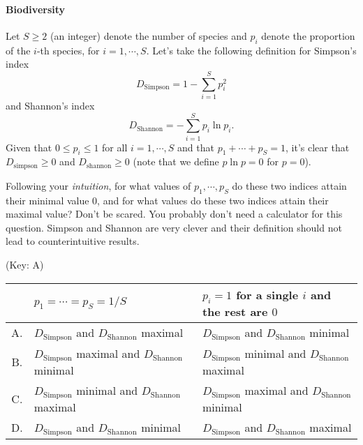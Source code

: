 \documentclass{article}
\begin{document}
\paragraph*{Biodiversity}
Let $S\ge 2$ (an integer) denote the number of species and $p_i$ denote the proportion of the $i$-th species, for $i=1,\cdots,S$.
Let's take the following definition for Simpson's index
\[ D_{\text{Simpson}} = 1 - \sum_{i=1}^S p_i^2 \]
and Shannon's index
\[ D_{\text{Shannon}} = -\sum_{i=1}^S p_i \ln p_i. \]
Given that $0\le p_i \le 1$ for all $i=1,\cdots,S$ and that $p_1+\cdots+p_S = 1$, it's clear that $D_{\text{simpson}} \ge 0$ and $D_{\text{shannon}} \ge 0$ (note that we define $p\ln p = 0$ for $p=0$).
\par
Following your \textit{intuition}, for what values of $p_1,\cdots,p_S$ do these two indices attain their minimal value $0$, and for what values do these two indices attain their maximal value?
Don't be scared.
You probably don't need a calculator for this question.
Simpson and Shannon are very clever and their definition should not lead to counterintuitive results.
\par
(Key: A)
\begin{center}
    \begin{tabular}{cll}
        \toprule
        & $p_1=\cdots=p_S=1/S$ & $p_i=1$ for a single $i$ and the rest are $0$ \\
        \midrule
        A. & $D_{\text{Simpson}}$ and $D_{\text{Shannon}}$ maximal & $D_{\text{Simpson}}$ and $D_{\text{Shannon}}$ minimal \\
        B. & $D_{\text{Simpson}}$ maximal and $D_{\text{Shannon}}$ minimal & $D_{\text{Simpson}}$ minimal and $D_{\text{Shannon}}$ maximal \\
        C. & $D_{\text{Simpson}}$ minimal and $D_{\text{Shannon}}$ maximal & $D_{\text{Simpson}}$ maximal and $D_{\text{Shannon}}$ minimal \\
        D. & $D_{\text{Simpson}}$ and $D_{\text{Shannon}}$ minimal & $D_{\text{Simpson}}$ and $D_{\text{Shannon}}$ maximal \\
        \bottomrule
    \end{tabular}
\end{center}
%    

% 
% 
\end{document}
